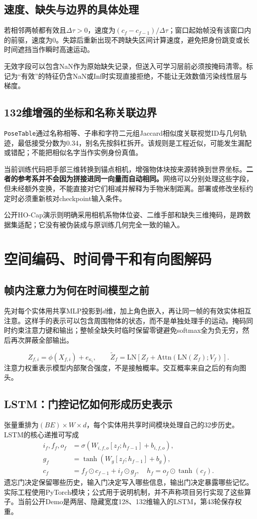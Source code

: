 \documentclass[11pt,a4paper,UTF8,fontset=fandol]{ctexart}
\newcommand{\code}[1]{{\small\nolinkurl{#1}}}
\begin{document}
\subsection{速度、缺失与边界的具体处理}
若相邻两帧都有效且$\Delta\tau>0$，速度为$(c_f-c_{f-1})/\Delta\tau$；窗口起始帧没有该窗口内的前驱，速度为0。失踪后重新出现不跨缺失区间计算速度，避免把身份跳变或长时间遮挡当作瞬时高速运动。

无效字段可以包含NaN作为原始缺失记录，但送入可学习层前必须按掩码清零。标记为“有效”的特征仍含NaN或Inf时实现直接拒绝，不能让无效数值污染线性层与梯度。

\subsection{132维增强的坐标和名称关联边界}
\code{PoseTable}通过名称相等、子串和字符二元组Jaccard相似度关联视觉ID与几何轨迹，最低接受分数为0.34，别名先按斜杠拆开。该规则是工程近似，可能发生漏配或错配；不能把相似名字当作实例身份真值。

当前训练代码把手部三维转换到锚点相机，增强物体块按来源转换到世界坐标。\textbf{二者的参考系并不会因为拼接进同一向量而自动相同。}网络可以分别处理这些字段，但未经额外变换，不能直接对它们相减并解释为手物米制距离。部署或修改坐标约定时必须重新核对checkpoint输入条件。

公开HO-Cap演示则明确采用相机系物体位姿、二维手部和缺失三维掩码，是跨数据集适配；它没有被伪装成与原训练几何完全一致的输入。

\section{空间编码、时间骨干和有向图解码}
\subsection{帧内注意力为何在时间模型之前}
先对每个实体用共享MLP投影到$d$维，加上角色嵌入，再让同一帧的有效实体相互注意。这样手的表示可以包含周围物体的状态，而不是单独处理手的运动。掩码同时约束注意力键和输出；整帧全缺失时临时保留零键避免softmax全为负无穷，然后再次屏蔽全部输出。

\[
Z_{f,i}=\phi(X_{f,i})+e_{\kappa_i},\qquad
\widetilde Z_f=\mathrm{LN}\left[Z_f+\mathrm{Attn}(\mathrm{LN}(Z_f);V_f)\right].
\]
注意力权重表示模型内部聚合强度，不是接触概率。交互概率来自之后的有向图头。

\subsection{LSTM：门控记忆如何形成历史表示}
张量重排为$(BE)\times W\times d$，每个实体用共享时间模块处理自己的32步历史。LSTM的核心递推可写成
\begin{align*}
i_f,f_f,o_f&=\sigma(W_{i,f,o}[z_f;h_{f-1}]+b_{i,f,o}),\\
g_f&=\tanh(W_g[z_f;h_{f-1}]+b_g),\\
c_f&=f_f\odot c_{f-1}+i_f\odot g_f,\quad
h_f=o_f\odot\tanh(c_f).
\end{align*}
遗忘门决定保留哪些历史，输入门决定写入哪些信息，输出门决定暴露哪些记忆。实际工程使用PyTorch模块；公式用于说明机制，并不声称项目另行实现了这些算子。当前公开Demo是两层、隐藏宽度128、132维输入的LSTM，第43轮保存权重。
\end{document}

